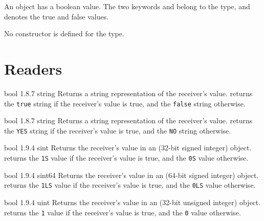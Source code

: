 

An  object has a boolean value. The two keywords  and  belong to the  type, and denotes the true and false values.

No constructor is defined for the  type.

\section{Readers}

{bool}
{1.8.7}
{string}
{Returns a string representation of the receiver's value.}
{returns the \texttt{\textquotedbl true\textquotedbl} string if the receiver's value is true, and the \texttt{\textquotedbl false\textquotedbl} string otherwise.}







{bool}
{1.8.7}
{string}
{Returns a string representation of the receiver's value.}
{returns the \texttt{\textquotedbl YES\textquotedbl} string if the receiver's value is true, and the \texttt{\textquotedbl NO\textquotedbl} string otherwise.}




{bool}
{1.9.4}
{sint}
{Returns the receiver's value in an  (32-bit signed integer) object.}
{returns the \texttt{1S}  value if the receiver's value is true, and the \texttt{0S}  value otherwise.}




{bool}
{1.9.4}
{sint64}
{Returns the receiver's value in an  (64-bit signed integer) object.}
{returns the \texttt{1LS}  value if the receiver's value is true, and the \texttt{0LS}  value otherwise.}




{bool}
{1.9.4}
{uint}
{Returns the receiver's value in an  (32-bit unsigned integer) object.}
{returns the \texttt{1}  value if the receiver's value is true, and the \texttt{0}  value otherwise.}




